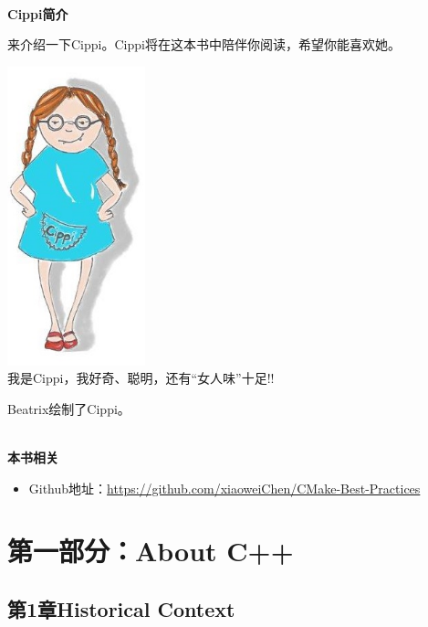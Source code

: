 \documentclass[11pt,a4paper,UTF8]{book}
\begin{document}
\begin{sloppypar}
  \hspace*{\fill} \\ %
  \noindent\textbf{Cippi简介}
  
  来介绍一下Cippi。Cippi将在这本书中陪伴你阅读，希望你能喜欢她。
  
  \begin{center}
  \includegraphics[width=0.3\textwidth]{content/Cippi.png}\\
  我是Cippi，我好奇、聪明，还有“女人味”十足!!
  \end{center}
  
  Beatrix绘制了Cippi。
  
  \hspace*{\fill} \\ %
  \noindent\textbf{本书相关}
  \begin{itemize}
  \item Github地址：\url{https://github.com/xiaoweiChen/CMake-Best-Practices}
  \end{itemize}
  \newpage
  
  \pagestyle{empty}
  
  \tableofcontents
  \newpage

  
  \color{white}
  \section*{第一部分：About C++}
  \pagecolor{mygray}
  \textbf{}
  \newpage
  \color{black}
  \pagecolor{white}

  \subsection*{ 第1章\hspace{0.5cm}Historical Context}
  
  

\end{sloppypar}
\end{document}
